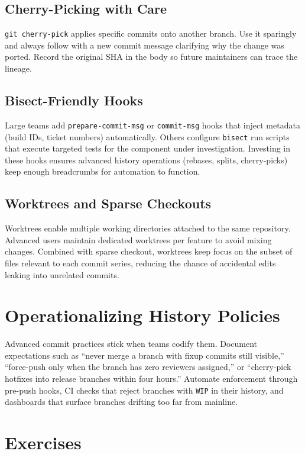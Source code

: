 \subsection{Cherry-Picking with Care}
\texttt{git cherry-pick} applies specific commits onto another branch. Use it sparingly and always follow with a new commit message clarifying why the change was ported. Record the original SHA in the body so future maintainers can trace the lineage.

\subsection{Bisect-Friendly Hooks}
Large teams add \texttt{prepare-commit-msg} or \texttt{commit-msg} hooks that inject metadata (build IDs, ticket numbers) automatically. Others configure \texttt{bisect} run scripts that execute targeted tests for the component under investigation. Investing in these hooks ensures advanced history operations (rebases, splits, cherry-picks) keep enough breadcrumbs for automation to function.

\subsection{Worktrees and Sparse Checkouts}
Worktrees enable multiple working directories attached to the same repository. Advanced users maintain dedicated worktrees per feature to avoid mixing changes. Combined with sparse checkout, worktrees keep focus on the subset of files relevant to each commit series, reducing the chance of accidental edits leaking into unrelated commits.

\section{Operationalizing History Policies}
Advanced commit practices stick when teams codify them. Document expectations such as ``never merge a branch with fixup commits still visible,'' ``force-push only when the branch has zero reviewers assigned,'' or ``cherry-pick hotfixes into release branches within four hours.'' Automate enforcement through pre-push hooks, CI checks that reject branches with \texttt{WIP} in their history, and dashboards that surface branches drifting too far from mainline.

\section*{Exercises}

